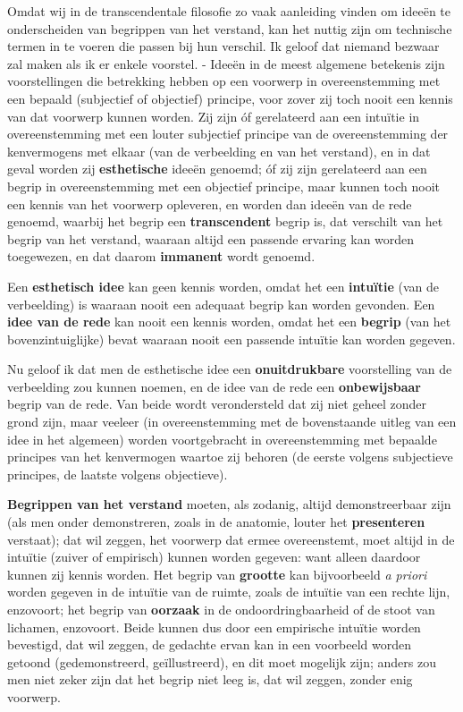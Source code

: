Omdat wij in de transcendentale filosofie zo vaak aanleiding vinden om ideeën te onderscheiden van begrippen van het verstand, kan het nuttig zijn om technische termen in te voeren die passen bij hun verschil. Ik geloof dat niemand bezwaar zal maken als ik er enkele voorstel. - 
Ideeën in de meest algemene betekenis zijn voorstellingen die betrekking hebben op een voorwerp in overeenstemming met een bepaald (subjectief of objectief) principe, voor zover zij toch nooit een kennis van dat voorwerp kunnen worden. Zij zijn óf gerelateerd aan een intuïtie in overeenstemming met een louter subjectief principe van de overeenstemming der kenvermogens met elkaar (van de verbeelding en van het verstand), en in dat geval worden zij \textbf{esthetische} ideeën genoemd; óf zij zijn gerelateerd aan een begrip in overeenstemming met een objectief principe, maar kunnen toch nooit een kennis van het voorwerp opleveren, en worden dan ideeën van de rede genoemd, waarbij het begrip een \textbf{transcendent} begrip is, dat verschilt van het begrip van het verstand, waaraan altijd een passende ervaring kan worden toegewezen, en dat daarom \textbf{immanent} wordt genoemd.

Een \textbf{esthetisch idee} kan geen kennis worden, omdat het een \textbf{intuïtie} (van de verbeelding) is waaraan nooit een adequaat begrip kan worden gevonden. Een \textbf{idee van de rede} kan nooit een kennis worden, omdat het een \textbf{begrip} (van het bovenzintuiglijke) bevat waaraan nooit een passende intuïtie kan worden gegeven.

Nu geloof ik dat men de esthetische idee een \textbf{onuitdrukbare} voorstelling van de verbeelding zou kunnen noemen, en de idee van de rede een \textbf{onbewijsbaar} begrip van de rede. Van beide wordt verondersteld dat zij niet geheel zonder grond zijn, maar veeleer (in overeenstemming met de bovenstaande uitleg van een idee in het algemeen) worden voortgebracht in overeenstemming met bepaalde principes van het kenvermogen waartoe zij behoren (de eerste volgens subjectieve principes, de laatste volgens objectieve).

\textbf{Begrippen van het verstand} moeten, als zodanig, altijd demonstreerbaar zijn (als men onder demonstreren, zoals in de anatomie, louter het \textbf{presenteren} verstaat); dat wil zeggen, het voorwerp dat ermee overeenstemt, moet altijd in de intuïtie (zuiver of empirisch) kunnen worden gegeven: want alleen daardoor kunnen zij kennis worden. Het begrip van \textbf{grootte} kan bijvoorbeeld \textit{a priori} worden gegeven in de intuïtie van de ruimte, zoals de intuïtie van een rechte lijn, enzovoort; het begrip van \textbf{oorzaak} in de ondoordringbaarheid of de stoot van lichamen, enzovoort. Beide kunnen dus door een empirische intuïtie worden bevestigd, dat wil zeggen, de gedachte ervan kan in een voorbeeld worden getoond (gedemonstreerd, geïllustreerd), en dit moet mogelijk zijn; anders zou men niet zeker zijn dat het begrip niet leeg is, dat wil zeggen, zonder enig voorwerp.

